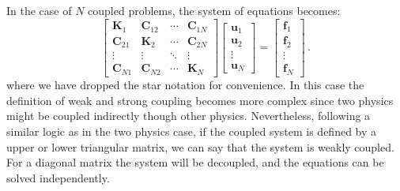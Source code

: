     In the case of $N$ coupled problems, the system of equations becomes:
    \begin{equation} \label{eq:multiphysics_strong}
        \begin{bmatrix}
            \mathbf{K}_1    & \mathbf{C}_{12} & \cdots & \mathbf{C}_{1N} \\
            \mathbf{C}_{21} & \mathbf{K}_2    & \cdots & \mathbf{C}_{2N} \\
            \vdots          & \vdots          & \ddots & \vdots          \\
            \mathbf{C}_{N1} & \mathbf{C}_{N2} & \cdots & \mathbf{K}_N
        \end{bmatrix}
        \begin{bmatrix}
            \mathbf{u}_1 \\
            \mathbf{u}_2 \\
            \vdots       \\
            \mathbf{u}_N
        \end{bmatrix}
        =
        \begin{bmatrix}
            \mathbf{f}_1 \\
            \mathbf{f}_2 \\
            \vdots       \\
            \mathbf{f}_N
        \end{bmatrix}\,.
    \end{equation}
    where we have dropped the star notation for convenience. In this case the
    definition of weak and strong coupling
    becomes more complex since two physics might be coupled indirectly though other
    physics. Nevertheless, following a similar logic as in the two physics case, if
    the coupled
    system is defined by a upper or lower triangular matrix, we can say that the
    system is weakly coupled. 
    For a diagonal matrix the system will be decoupled, and the equations can be
    solved independently.

